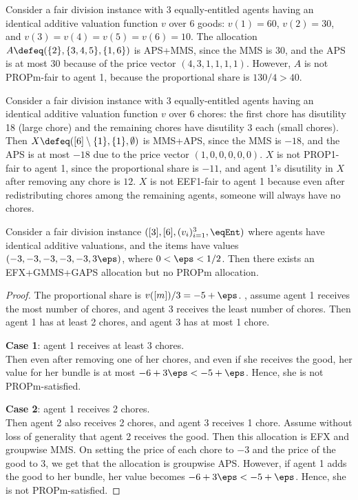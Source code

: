 \begin{example}
\label{cex:aps-not-propm}
Consider a fair division instance with 3 equally-entitled agents
having an identical additive valuation function $v$ over 6 goods:
$v(1) = 60$, $v(2) = 30$, and $v(3) = v(4) = v(5) = v(6) = 10$.
The allocation $A \defeq (\{2\}, \{3, 4, 5\}, \{1, 6\})$ is APS+MMS, since the MMS is 30,
and the APS is at most 30 because of the price vector $(4, 3, 1, 1, 1, 1)$.
However, $A$ is not PROPm-fair to agent 1, because the proportional share is $130/4 > 40$.
\end{example}

\begin{example}
\label{cex:aps-not-prop1-chores}
Consider a fair division instance with 3 equally-entitled agents
having an identical additive valuation function $v$ over 6 chores:
the first chore has disutility 18 (large chore) and the remaining chores have disutility 3 each (small chores).
Then $X \defeq ([6] \setminus \{1\}, \{1\}, \emptyset)$ is MMS+APS,
since the MMS is $-18$, and the APS is at most $-18$ due to the price vector $(1, 0, 0, 0, 0, 0)$.
$X$ is not PROP1-fair to agent 1, since the proportional share is $-11$,
and agent 1's disutility in $X$ after removing any chore is $12$.
$X$ is not EEF1-fair to agent 1 because even after redistributing chores among the remaining agents,
someone will always have no chores.
\end{example}

\begin{lemma}
\label{cex:propm-mixed-manna}
Consider a fair division instance $([3], [6], (v_i)_{i=1}^3, \eqEnt)$
where agents have identical additive valuations, and the items have values
$(-3, -3, -3, -3, -3, 3\eps)$, where $0 < \eps < 1/2$.
Then there exists an EFX+GMMS+GAPS allocation but no PROPm allocation.
\end{lemma}
\begin{proof}
The proportional share is $v([m])/3 = -5 + \eps$.
\WLoG, assume agent 1 receives the most number of chores,
and agent 3 receives the least number of chores.
Then agent 1 has at least 2 chores, and agent 3 has at most 1 chore.

\textbf{Case 1}: agent 1 receives at least 3 chores.
\\ Then even after removing one of her chores, and even if she receives the good,
her value for her bundle is at most $-6 + 3\eps < -5 + \eps$.
Hence, she is not PROPm-satisfied.

\textbf{Case 2}: agent 1 receives 2 chores.
\\ Then agent 2 also receives 2 chores, and agent 3 receives 1 chore.
Assume without loss of generality that agent 2 receives the good.
Then this allocation is EFX and groupwise MMS.
On setting the price of each chore to $-3$ and the price of the good to 3,
we get that the allocation is groupwise APS.
However, if agent 1 adds the good to her bundle, her value becomes $-6 + 3\eps < -5 + \eps$.
Hence, she is not PROPm-satisfied.
\end{proof}

